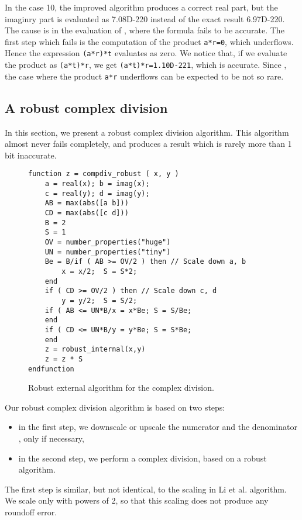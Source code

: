 \documentclass{paper}
\newcommand{\scivar}[1]{\texttt{#1}}
\begin{document}
In the case 10, the improved algorithm produces 
a correct real part, but the imaginry part is evaluated as 
7.08D-220 instead of the exact result 6.97D-220.
The cause is in the evaluation of , where the formula 
fails to be accurate. 
The first step which fails is the computation of the product \scivar{a*r=0}, 
which underflows. 
Hence the expression \scivar{(a*r)*t} evaluates as zero. 
We notice that, if we evaluate the product as \scivar{(a*t)*r}, 
we get \scivar{(a*t)*r=1.10D-221}, which is accurate.
Since , the case where the product \scivar{a*r} underflows 
can be expected to be not so rare.


\subsection{A robust complex division}
In this section, we present a robust complex division 
algorithm. 
This algorithm almost never fails completely, and 
produces a result which is rarely more than 1 bit 
inaccurate. 

\begin{figure}
\caption{Robust external algorithm for the complex division.}
\label{fig-compdiv-algorobust}
\lstset{language=scilabscript}
\begin{lstlisting}
function z = compdiv_robust ( x, y )
    a = real(x); b = imag(x);
    c = real(y); d = imag(y);
    AB = max(abs([a b]))
    CD = max(abs([c d]))
    B = 2
    S = 1
    OV = number_properties("huge")
    UN = number_properties("tiny")
    Be = B/if ( AB >= OV/2 ) then // Scale down a, b
        x = x/2;  S = S*2;
    end
    if ( CD >= OV/2 ) then // Scale down c, d
        y = y/2;  S = S/2;
    if ( AB <= UN*B/x = x*Be; S = S/Be;
    end
    if ( CD <= UN*B/y = y*Be; S = S*Be;
    end
    z = robust_internal(x,y)
    z = z * S
endfunction
\end{lstlisting}
\end{figure}

Our robust complex division algorithm is based on two steps:
\begin{itemize}
\item in the first step, we downscale or upscale the numerator  
and the denominator , only if necessary,
\item in the second step, we perform a complex division, based 
on a robust algorithm.
\end{itemize}

The first step is similar, but not identical, to the scaling 
in Li et al. algorithm. 
We scale only with powers of 2, so that this scaling does not 
produce any roundoff error. 
\end{document}
